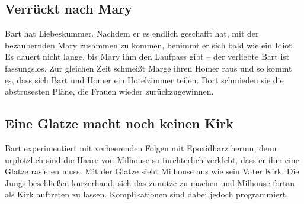 
\subsection{Verrückt nach Mary}\label{RABF07}
Bart hat Liebeskummer. Nachdem er es endlich geschafft hat, mit der bezaubernden Mary zusammen zu kommen, benimmt er sich bald wie ein Idiot. Es dauert nicht lange, bis Mary ihm den Laufpass gibt -- der verliebte Bart ist fassungslos. Zur gleichen Zeit schmeißt Marge ihren Homer raus und so kommt es, dass sich Bart und Homer ein Hotelzimmer teilen. Dort schmieden sie die abstrusesten Pläne, die Frauen wieder zurückzugewinnen.


\subsection{Eine Glatze macht noch keinen Kirk}
Bart experimentiert mit verheerenden Folgen mit Epoxidharz herum, denn urplötzlich sind die Haare von Milhouse so fürchterlich verklebt, dass er ihm eine Glatze rasieren muss. Mit der Glatze sieht Milhouse aus wie sein Vater Kirk. Die Jungs beschließen kurzerhand, sich das zunutze zu machen und Milhouse fortan als Kirk auftreten zu lassen. Komplikationen sind dabei jedoch programmiert.


